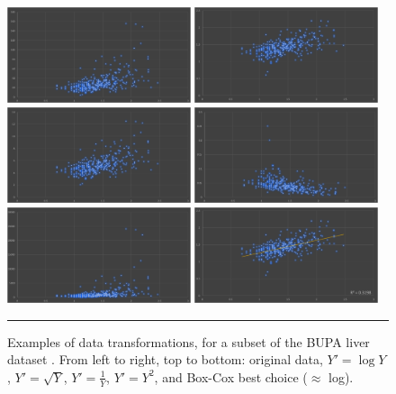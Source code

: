 \begin{figure}[t]
\centering
\includegraphics[width=0.48\textwidth]{Images/original_BUPA.png}
\quad
\includegraphics[width=0.48\textwidth]{Images/log.png} \\
\includegraphics[width=0.48\textwidth]{Images/sqrt.png} 
\quad
\includegraphics[width=0.48\textwidth]{Images/inverse.png} \\
\includegraphics[width=0.48\textwidth]{Images/square.png} 
\quad
\includegraphics[width=0.48\textwidth]{Images/boxcox.png}
\caption[\small Examples of data transformations]{\small Examples of data transformations, for a subset of the BUPA liver dataset \cite{DP_BUPA}. From left to right, top to bottom: original data, $Y'=\log Y$, $Y'=\sqrt{Y}$, $Y'=\frac{1}{Y}$, $Y'=Y^2$, and Box-Cox best choice ($\approx$ log). }
\hrule\label{fig:transforms}
\end{figure}
